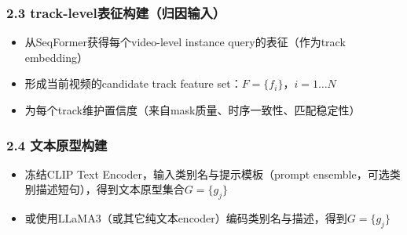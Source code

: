 \documentclass[UTF8]{ctexart}
\begin{document}
\subsubsection*{2.3 track-level表征构建（归因输入）}
\begin{itemize}
\item 从SeqFormer获得每个video-level instance query的表征（作为track embedding）
\item 形成当前视频的candidate track feature set：$F = \{f_i\}，i=1 \dots N$
\item 为每个track维护置信度（来自mask质量、时序一致性、匹配稳定性）
\end{itemize}

\subsubsection*{2.4 文本原型构建}
\begin{itemize}
\item 冻结CLIP Text Encoder，输入类别名与提示模板（prompt ensemble，可选类别描述短句），得到文本原型集合$G=\{g_j\}$
\item 或使用LLaMA3（或其它纯文本encoder）编码类别名与描述，得到$G=\{g_j\}$
\end{itemize}
\end{document}
